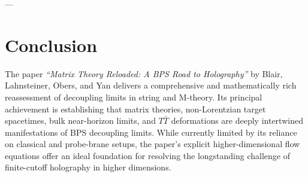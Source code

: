 \documentclass[11pt,a4paper]{article}
\begin{document}
---

\section{Conclusion}
The paper \emph{``Matrix Theory Reloaded: A BPS Road to Holography''} by Blair, Lahnsteiner, Obers, and Yan delivers a comprehensive and mathematically rich reassessment of decoupling limits in string and M-theory. Its principal achievement is establishing that matrix theories, non-Lorentzian target spacetimes, bulk near-horizon limits, and $T\bar{T}$ deformations are deeply intertwined manifestations of BPS decoupling limits. While currently limited by its reliance on classical and probe-brane setups, the paper's explicit higher-dimensional flow equations offer an ideal foundation for resolving the longstanding challenge of finite-cutoff holography in higher dimensions.
\end{document}
